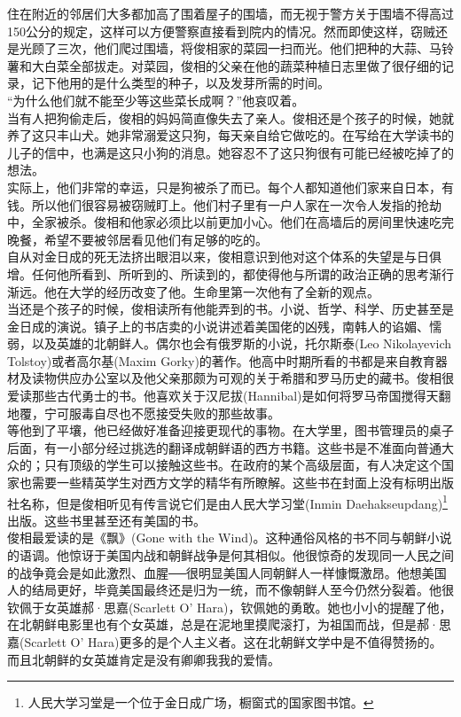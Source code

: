 \begin{multicols}{\theparacolNo}
住在附近的邻居们大多都加高了围着屋子的围墙，而无视于警方关于围墙不得高过150公分的规定，这样可以方便警察直接看到院内的情况。然而即使这样，窃贼还是光顾了三次，他们爬过围墙，将俊相家的菜园一扫而光。他们把种的大蒜、马铃薯和大白菜全部拔走。对菜园，俊相的父亲在他的蔬菜种植日志里做了很仔细的记录，记下他用的是什么类型的种子，以及发芽所需的时间。\\

“为什么他们就不能至少等这些菜长成啊？”他哀叹着。\\

当有人把狗偷走后，俊相的妈妈简直像失去了亲人。俊相还是个孩子的时候，她就养了这只丰山犬。她非常溺爱这只狗，每天亲自给它做吃的。在写给在大学读书的儿子的信中，也满是这只小狗的消息。她容忍不了这只狗很有可能已经被吃掉了的想法。\\

实际上，他们非常的幸运，只是狗被杀了而已。每个人都知道他们家来自日本，有钱。所以他们很容易被窃贼盯上。他们村子里有一户人家在一次令人发指的抢劫中，全家被杀。俊相和他家必须比以前更加小心。他们在高墙后的房间里快速吃完晚餐，希望不要被邻居看见他们有足够的吃的。\\

自从对金日成的死无法挤出眼泪以来，俊相意识到他对这个体系的失望是与日俱增。任何他所看到、所听到的、所读到的，都使得他与所谓的政治正确的思考渐行渐远。他在大学的经历改变了他。生命里第一次他有了全新的观点。\\

当还是个孩子的时候，俊相读所有他能弄到的书。小说、哲学、科学、历史甚至是金日成的演说。镇子上的书店卖的小说讲述着美国佬的凶残，南韩人的谄媚、懦弱，以及英雄的北朝鲜人。偶尔也会有俄罗斯的小说，托尔斯泰(Leo Nikolayevich Tolstoy)或者高尔基(Maxim Gorky)的著作。他高中时期所看的书都是来自教育器材及读物供应办公室以及他父亲那颇为可观的关于希腊和罗马历史的藏书。俊相很爱读那些古代勇士的书。他喜欢关于汉尼拔(Hannibal)是如何将罗马帝国搅得天翻地覆，宁可服毒自尽也不愿接受失败的那些故事。\\

等他到了平壤，他已经做好准备迎接更现代的事物。在大学里，图书管理员的桌子后面，有一小部分经过挑选的翻译成朝鲜语的西方书籍。这些书是不准面向普通大众的；只有顶级的学生可以接触这些书。在政府的某个高级层面，有人决定这个国家也需要一些精英学生对西方文学的精华有所瞭解。这些书在封面上没有标明出版社名称，但是俊相听见有传言说它们是由人民大学习堂(Inmin Daehakseupdang)\footnote{人民大学习堂是一个位于金日成广场，橱窗式的国家图书馆。}出版。这些书里甚至还有美国的书。\\

俊相最爱读的是《飘》(Gone with the Wind)。这种通俗风格的书不同与朝鲜小说的语调。他惊讶于美国内战和朝鲜战争是何其相似。他很惊奇的发现同一人民之间的战争竟会是如此激烈、血腥──很明显美国人同朝鲜人一样慷慨激昂。他想美国人的结局更好，毕竟美国最终还是归为一统，而不像朝鲜人至今仍然分裂着。他很钦佩于女英雄郝·思嘉(Scarlett O{\EN '} Hara)，钦佩她的勇敢。她也小小的提醒了他，在北朝鲜电影里也有个女英雄，总是在泥地里摸爬滚打，为祖国而战，但是郝·思嘉(Scarlett O{\EN '} Hara)更多的是个人主义者。这在北朝鲜文学中是不值得赞扬的。而且北朝鲜的女英雄肯定是没有卿卿我我的爱情。\\


\end{multicols}
